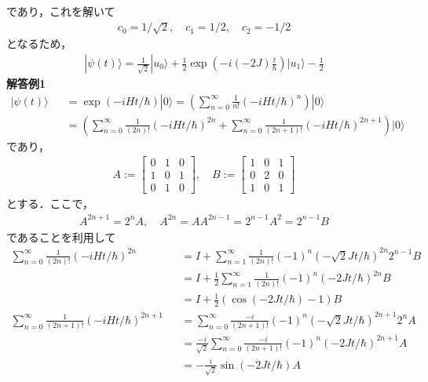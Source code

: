 \documentclass[12pt,dvipdfmx]{jsarticle}
\begin{document}
であり，これを解いて
\begin{eqnarray}
  c_0 = 1/\sqrt{2},\quad c_1 = 1/2,\quad c_2 = -1/2
\end{eqnarray}
となるため，
\begin{eqnarray}
  |\psi(t)\rangle = \frac{1}{\sqrt{2}}|u_0\rangle + \frac{1}{2}\exp\left( -i(-2J)\frac{t}{\hbar} \right)|u_1\rangle-\frac{1}{2}
\end{eqnarray}
\textbf{解答例1}\\
\begin{eqnarray}
  |\psi(t)\rangle &&= \exp( -iHt/\hbar )|0\rangle = \left( \sum_{n=0}^{\infty}\frac{1}{n!}(-iHt/\hbar)^n  \right)|0\rangle\\
  &&= \left( \sum_{n=0}^{\infty}\frac{1}{(2n)!}(-iHt/\hbar)^{2n} + \sum_{n=0}^{\infty}\frac{1}{(2n+1)!}(-iHt/\hbar)^{2n+1} \right)|0\rangle
\end{eqnarray}
であり，
\begin{eqnarray}
  A:= 
  \begin{bmatrix}
    0 & 1& 0\\
    1 & 0 & 1\\
    0 & 1& 0
  \end{bmatrix},\quad
  B:=
  \begin{bmatrix}
    1 & 0 & 1\\
    0 & 2& 0\\
    1 & 0 & 1
  \end{bmatrix}
\end{eqnarray}
とする．ここで，
\begin{eqnarray}
  A^{2n+1} = 2^nA, \quad A^{2n} = A A^{2n-1} = 2^{n-1}A^2 = 2^{n-1}B 
\end{eqnarray}
であることを利用して
\begin{eqnarray}
  \sum_{n=0}^{\infty}\frac{1}{(2n)!}(-iHt/\hbar)^{2n} &&= I + \sum_{n=1}^{\infty} \frac{1}{(2n)!}(-1)^n (-\sqrt{2}J t/\hbar)^{2n}2^{n-1} B\\
  &&= I + \frac{1}{2}\sum_{n=1}^{\infty} \frac{1}{(2n)!}(-1)^n (-2J t/\hbar)^{2n} B\\
  &&= I + \frac{1}{2}\left( \cos(-2J t/\hbar)-1 \right)B\\
  \sum_{n=0}^{\infty}\frac{1}{(2n+1)!}(-iHt/\hbar)^{2n+1} &&= \sum_{n=0}^{\infty} \frac{-i}{(2n+1)!}(-1)^n (-\sqrt{2}J t/\hbar)^{2n+1}2^n A\\
  &&= \frac{-i}{\sqrt{2}}\sum_{n=0}^{\infty} \frac{-i}{(2n+1)!}(-1)^n (-2J t/\hbar)^{2n+1} A\\
  &&= -\frac{i}{\sqrt{2}}\sin(-2J t/\hbar)A
\end{eqnarray}
\end{document}
